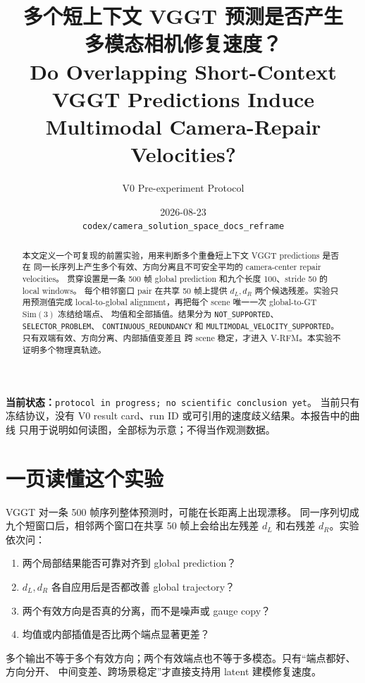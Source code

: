 \documentclass[UTF8,a4paper,11pt]{ctexart}
\title{\bfseries\color{GlobalBlue}多个短上下文 VGGT 预测是否产生\\多模态相机修复速度？\\[0.45em]
\large Do Overlapping Short-Context VGGT Predictions Induce\\
Multimodal Camera-Repair Velocities?}
\author{V0 Pre-experiment Protocol}
\date{2026-08-23\\[0.25em]
\texttt{codex/camera\_solution\_space\_docs\_reframe}}
\newcommand{\Sim}{\mathrm{Sim}}
\begin{document}
\maketitle

\begin{statusbox}
\textbf{当前状态：}\texttt{protocol in progress; no scientific conclusion yet}。
当前只有冻结协议，没有 V0 result card、run ID 或可引用的速度歧义结果。本报告中的曲线
只用于说明如何读图，全部标为示意；不得当作观测数据。
\end{statusbox}

\begin{abstract}
本文定义一个可复现的前置实验，用来判断多个重叠短上下文 VGGT predictions 是否在
同一长序列上产生多个有效、方向分离且不可安全平均的 camera-center repair velocities。
贯穿设置是一条 500 帧 global prediction 和九个长度 100、stride 50 的 local windows。
每个相邻窗口 pair 在共享 50 帧上提供 $d_L,d_R$ 两个候选残差。实验只用预测值完成
local-to-global alignment，再把每个 scene 唯一一次 global-to-GT $\Sim(3)$ 冻结给端点、
均值和全部插值。结果分为 \texttt{NOT\_SUPPORTED}、\texttt{SELECTOR\_PROBLEM}、
\texttt{CONTINUOUS\_REDUNDANCY} 和
\texttt{MULTIMODAL\_VELOCITY\_SUPPORTED}。只有双端有效、方向分离、内部插值变差且
跨 scene 稳定，才进入 V-RFM。本实验不证明多个物理真轨迹。
\end{abstract}

\tableofcontents
\newpage

\section{一页读懂这个实验}

VGGT\citep{wang2025vggt} 对一条 500 帧序列整体预测时，可能在长距离上出现漂移。
同一序列切成九个短窗口后，相邻两个窗口在共享 50 帧上会给出左残差 $d_L$ 和右残差
$d_R$。实验依次问：
\begin{enumerate}
  \item 两个局部结果能否可靠对齐到 global prediction？
  \item $d_L,d_R$ 各自应用后是否都改善 global trajectory？
  \item 两个有效方向是否真的分离，而不是噪声或 gauge copy？
  \item 均值或内部插值是否比两个端点显著更差？
\end{enumerate}

\begin{keybox}
多个输出不等于多个有效方向；两个有效端点也不等于多模态。只有“端点都好、方向分开、
中间变差、跨场景稳定”才直接支持用 latent 建模修复速度。
\end{keybox}
\end{document}
